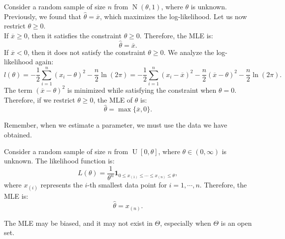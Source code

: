 \documentclass{huhtakm-template-book-v2}
\DeclareMathOperator{\N}{N}
\DeclareMathOperator{\U}{U}
\begin{document}
    \begin{eg}
        Consider a random sample of size $n$ from $\N(\theta, 1)$, where $\theta$ is unknown. Previously, we found that $\hat{\theta} = \overline{x}$, which maximizes the log-likelihood. Let us now restrict $\theta \geq 0$.\\
        If $\overline{x} \geq 0$, then it satisfies the constraint $\theta \geq 0$. Therefore, the MLE is:
        \begin{equation*}
            \hat{\theta} = \overline{x}.
        \end{equation*}
        If $\overline{x} < 0$, then it does not satisfy the constraint $\theta \geq 0$. We analyze the log-likelihood again:
        \begin{equation*}
            l(\theta) = -\frac{1}{2} \sum_{i=1}^{n} (x_{i} - \theta)^{2} - \frac{n}{2} \ln(2\pi) = -\frac{1}{2} \sum_{i=1}^{n} (x_{i} - \overline{x})^{2} - \frac{n}{2} (\overline{x} - \theta)^{2} - \frac{n}{2} \ln(2\pi).
        \end{equation*}
        The term $(\overline{x} - \theta)^{2}$ is minimized while satisfying the constraint when $\theta = 0$.\\
        Therefore, if we restrict $\theta \geq 0$, the MLE of $\theta$ is:
        \begin{equation*}
            \hat{\theta} = \max\{\overline{x}, 0\}.
        \end{equation*}
    \end{eg}
    \begin{rem}
        Remember, when we estimate a parameter, we must use the data we have obtained.
    \end{rem}
    \begin{eg}
        Consider a random sample of size $n$ from $\U[0, \theta]$, where $\theta \in (0, \infty)$ is unknown. The likelihood function is:
        \begin{equation*}
            L(\theta) = \frac{1}{\theta^{n}} \mathbf{1}_{0 \leq x_{(1)} \leq \cdots \leq x_{(n)} \leq \theta},
        \end{equation*}
        where $x_{(i)}$ represents the $i$-th smallest data point for $i = 1, \cdots, n$. Therefore, the MLE is:
        \begin{equation*}
            \hat{\theta} = x_{(n)}.
        \end{equation*}
    \end{eg}
    \begin{rem}
        The MLE may be biased, and it may not exist in $\Theta$, especially when $\Theta$ is an open set.
    \end{rem}
    \newpage
\end{document}
